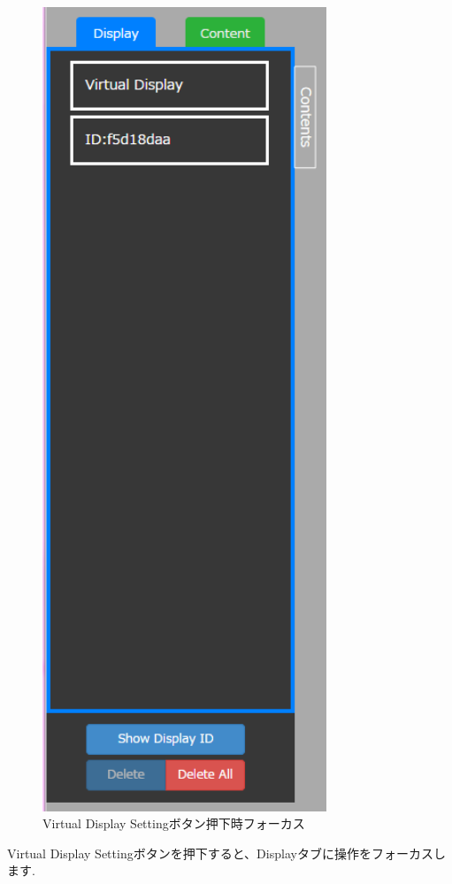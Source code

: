 \documentclass[a4paper,10pt,oneside]{jsbook}
\begin{document}
\begin{figure}[htbp]
	\begin{center}
		\includegraphics[width=8.5cm]{image/Left_Display.PNG}
	\end{center}
	\caption{Virtual Display Settingボタン押下時フォーカス}
	\label{fig:vdsfocus}
\end{figure}




Virtual Display Settingボタンを押下すると、Displayタブに操作をフォーカスします.\\



\clearpage 
\end{document}
